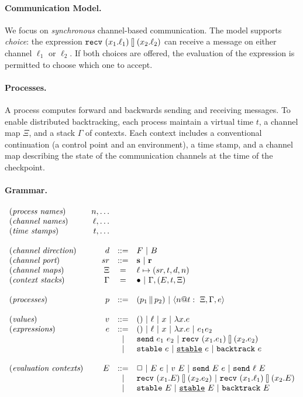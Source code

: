 \documentclass{article}
\begin{document}
\paragraph*{Communication Model.} We focus on \emph{synchronous}
channel-based communication. The model supports \emph{choice}: the expression
$\recv{x_1}{\ell_1}{x_2}{\ell_2}$ can receive a message on either channel
$\ell_1$ or $\ell_2$. If both choices are offered, the evaluation of the
expression is permitted to choose which one to accept. 

\paragraph*{Processes.} A process computes forward and backwards sending and
receiving messages. To enable distributed backtracking, each process maintain
a virtual time $t$, a channel map $\Xi$, and a stack $\Gamma$ of
contexts. Each context includes a conventional continuation (a control point
and an environment), a time stamp, and a channel map describing the state of
the communication channels at the time of the checkpoint. 

\paragraph*{Grammar.}

\[\begin{array}{lrcl}
(\textit{process names}) & n, \ldots \\
(\textit{channel names}) & \ell, \ldots \\
(\textit{time stamps}) & t, \ldots \\
\\
(\textit{channel direction}) & d &::=& F \alt B \\
(\textit{channel port}) & sr &::=& \textbf{s} \alt \textbf{r} \\
(\textit{channel maps}) & \Xi &=& \ell \mapsto (sr,t,d,n) \\
(\textit{context stacks}) & \Gamma &=& \bullet \alt \Gamma,(E,t,\Xi) \\
\\
(\textit{processes}) & p &::=& (\parc{p_1}{p_2}) \alt \proc{n}{\Gamma}{\Xi}{e}{t} \\
\\
(\textit{values}) & v &::=& () \alt \ell \alt x \alt \lambda x.e \\
(\textit{expressions}) & e &::=& () \alt \ell \alt x \alt \lambda x.e 
  \alt e_1e_2 \\
  &&\alt& \send{e_1}{e_2} \alt \recv{x_1}{e_1}{x_2}{e_2} \\
  &&\alt& \stable{e} \alt \stableu{e} \alt \backtrack{e} \\
\\
(\textit{evaluation contexts}) & E &::=& \Box \alt E~e \alt v~E \alt 
  \send{E}{e} \alt \send{\ell}{E} \\
  &&\alt& \recv{x_1}{E}{x_2}{e_2} \alt \recv{x_1}{\ell_1}{x_2}{E} \\
  &&\alt& \stable{E} \alt \stableu{E} \alt \backtrack{E}
\end{array}\]
\end{document}
